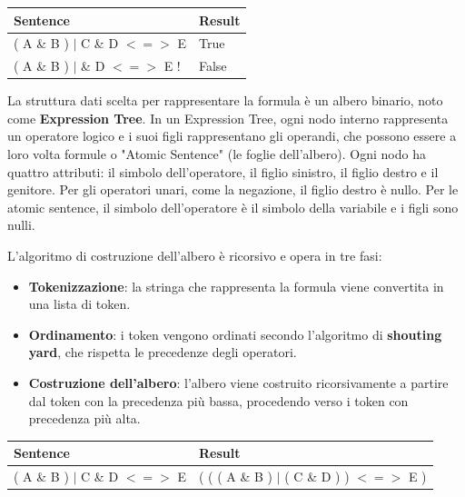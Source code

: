 \documentclass{article} %
\begin{document}
\vspace{0.5cm}

\begin{tabular}{|p{5cm}|p{5cm}|}
    \textbf{Sentence} & \textbf{Result} \\ \hline
    ( A \& B ) $|$ C \& D $<=>$ E & True \\
    ( A \& B ) $|$ \& D $<=>$ E ! & False \\
\end{tabular}

\vspace{0.5cm}

La struttura dati scelta per rappresentare la formula è un albero binario, noto come \textbf{Expression Tree}. In un Expression Tree, ogni nodo interno rappresenta un operatore logico e i suoi figli rappresentano gli operandi, che possono essere a loro volta formule o "Atomic Sentence" (le foglie dell'albero). Ogni nodo ha quattro attributi: il simbolo dell'operatore, il figlio sinistro, il figlio destro e il genitore. Per gli operatori unari, come la negazione, il figlio destro è nullo. Per le atomic sentence, il simbolo dell'operatore è il simbolo della variabile e i figli sono nulli.

L'algoritmo di costruzione dell'albero è ricorsivo e opera in tre fasi:

\begin{itemize}
    \item \textbf{Tokenizzazione}: la stringa che rappresenta la formula viene convertita in una lista di token.
    \item \textbf{Ordinamento}: i token vengono ordinati secondo l'algoritmo di \textbf{shouting yard}, che rispetta le precedenze degli operatori.
    \item \textbf{Costruzione dell'albero}: l'albero viene costruito ricorsivamente a partire dal token con la precedenza più bassa, procedendo verso i token con precedenza più alta.
\end{itemize}

\vspace{0.5cm}

\begin{tabular}{|p{4.5cm}|p{5.5cm}|}
    \textbf{Sentence} & \textbf{Result} \\ \hline
    ( A \& B ) $|$ C \& D $<=>$ E & ( ( ( A \& B ) $|$ ( C \& D ) ) $<=>$ E ) \\
\end{tabular}

\vspace{0.5cm}
\end{document}
